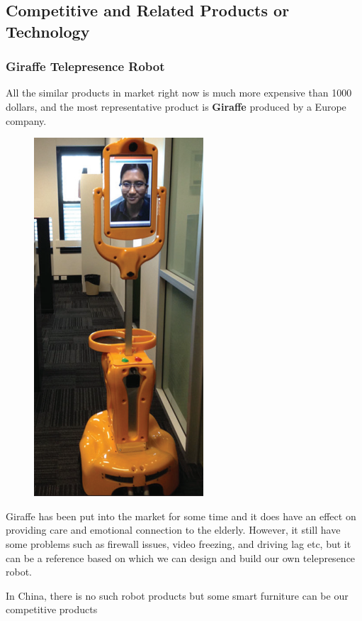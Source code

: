 \documentclass[12pt]{article}
\begin{document}
\subsection{Competitive and Related Products or Technology}
\subsubsection{Giraffe Telepresence Robot}
All the similar products in market right now is much more expensive than 1000 dollars, and the most representative product is \textbf{Giraffe} produced by a Europe company.
\begin{figure}[H]
\centering
\includegraphics[scale=1]{P2.png}
\end{figure}
Giraffe has been put into the market for some time and it does have an effect on providing care and emotional connection to the elderly. However, it still have some problems such as firewall issues, video freezing, and driving lag etc, but it can be a reference based on which we can design and build our own telepresence robot.
\par In China, there is no such robot products but some smart furniture can be our competitive products
\end{document}

